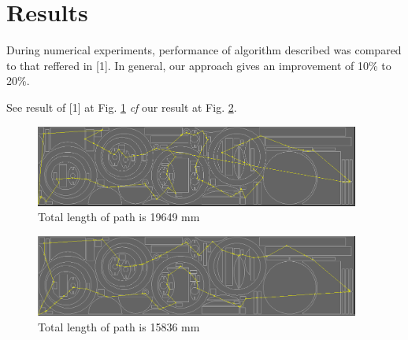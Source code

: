 \documentclass{../download/tPRS2e}
\begin{document}
\section{Results}

During numerical experiments,
performance of algorithm described
was compared to that reffered in [1].
In general, our approach gives an improvement of 10\% to 20\%.

See result of [1] at Fig. \ref{dynprog}
\textit{cf} our result at Fig. \ref{heuristics}.

\begin{figure}[]
    \includegraphics[width=0.95\textwidth]{mini-bad.png}
    \caption{Total length of path is 19649 mm}
    \label{dynprog}
\end{figure}

\begin{figure}[]
    \includegraphics[width=0.95\textwidth]{mini-good.png}
    \caption{Total length of path is 15836 mm}
    \label{heuristics}
\end{figure}
\end{document}
